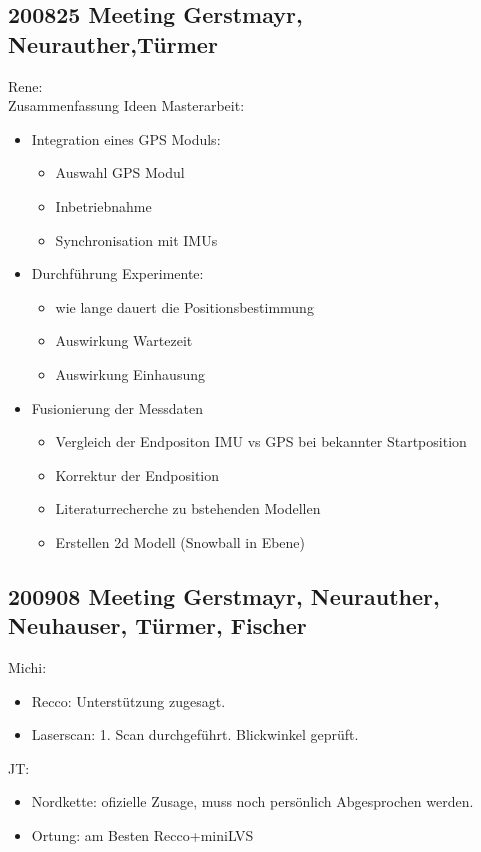 \documentclass{article}
\begin{document}
\subsection{200825 Meeting Gerstmayr, Neurauther,Türmer}
Rene:\\
Zusammenfassung Ideen Masterarbeit:
\begin{itemize}
\item
Integration eines GPS Moduls:
\begin{itemize}
\item
Auswahl GPS Modul
\item
Inbetriebnahme
\item
Synchronisation mit IMUs
\end{itemize}

\item
Durchführung Experimente:

\begin{itemize}
\item
wie lange dauert die Positionsbestimmung
\item
Auswirkung Wartezeit
\item
Auswirkung Einhausung
\end{itemize}

\item
Fusionierung der Messdaten
\begin{itemize}
\item
Vergleich der Endpositon IMU vs GPS bei bekannter Startposition
\item
Korrektur der Endposition
\item
Literaturrecherche zu bstehenden Modellen
\item
Erstellen 2d Modell (Snowball in Ebene)
\end{itemize}
\end{itemize}


\subsection{200908 Meeting Gerstmayr, Neurauther, Neuhauser, Türmer, Fischer}

Michi:
\begin{itemize}
\item
Recco: Unterstützung zugesagt.
\item
Laserscan: 1. Scan durchgeführt. Blickwinkel geprüft.
\end{itemize}

JT: 

\begin{itemize}
\item
Nordkette: ofizielle Zusage, muss noch persönlich Abgesprochen werden.
\item
Ortung: am Besten Recco+miniLVS
\end{itemize}
\end{document}
